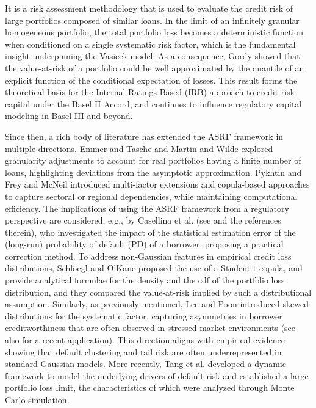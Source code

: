 \documentclass[preprint,12pt]{article}
\begin{document}
It is a risk assessment methodology that is used to evaluate the credit risk of large portfolios composed of similar loans. In the limit of an infinitely granular homogeneous portfolio, the total portfolio loss becomes a deterministic function when conditioned on a single systematic risk factor, which is the fundamental insight underpinning the Vasicek model. As a consequence,  Gordy \cite{gordy} showed that the value-at-risk of a portfolio could be well approximated by the quantile of an explicit function of the conditional expectation of losses. This result forms the theoretical basis for the Internal Ratings-Based (IRB) approach to credit risk capital under the Basel II Accord, and continues to influence regulatory capital modeling in Basel III and beyond.

Since then, a rich body of literature has extended the ASRF framework in multiple directions. Emmer and Tasche \cite{EmmTasc} and Martin and Wilde \cite{MartWild} explored granularity adjustments to account for real portfolios having a finite number of loans, highlighting deviations from the asymptotic approximation. Pykhtin \cite{pykhtin2004} and Frey and McNeil \cite{frey2003} introduced multi-factor extensions and copula-based approaches to capture sectoral or regional dependencies, while maintaining computational efficiency. The implications of using the ASRF framework from a regulatory perspective are considered, e.g., by Casellina et al. (see \cite{clu23} and the references therein), who investigated the impact of the statistical estimation error of the (long-run) probability of default (PD) of a borrower, proposing a practical correction method. 
To address non-Gaussian features in empirical credit loss distributions, Schloegl and O’Kane \cite{so05} proposed the use of a Student-t copula, and provide analytical formulae for the density and the cdf of the portfolio loss distribution, and they compared the value-at-risk implied by such a distributional assumption. Similarly, as previously mentioned, Lee and Poon \cite{lp15} introduced skewed distributions for the systematic factor, capturing asymmetries in borrower creditworthiness that are often observed in stressed market environments (see also \cite{ly19} for a recent application). This direction aligns with empirical evidence showing that default clustering and tail risk are often underrepresented in standard Gaussian models. More recently, Tang et al. \cite{TTY2021} developed a dynamic framework to model the underlying drivers of default risk and established a large-portfolio loss limit, the characteristics of which were analyzed through Monte Carlo simulation.
\end{document}
